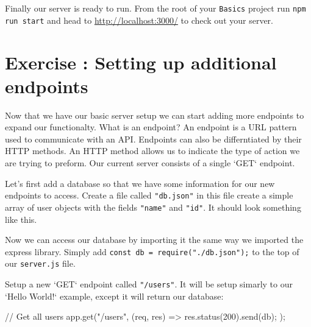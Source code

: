 \documentclass{42-en}
\begin{document}
	Finally our server is ready to run. From the root of your \texttt{Basics} project run \texttt{npm run start} and head to \href{http://localhost:3000/}{http://localhost:3000/} to check out your server.


\newpage
\nextexercice


\chapter{Exercise \exercicenumber: Setting up additional endpoints}

    Now that we have our basic server setup we can start adding more endpoints to expand our functionalty. What is an endpoint? An endpoint is a URL pattern used to communicate with an API. Endpoints can also be differntiated by their HTTP methods. An HTTP method allows us to indicate the type of action we are trying to preform. Our current server consists of a single `GET` endpoint.


    Let's first add a database so that we have some information for our new endpoints to access. Create a file called \texttt{"db.json"} in this file create a simple array of user objects with the fields \texttt{"name"} and \texttt{"id"}. It should look something like this.
\begin{42jscode}
\end{42jscode}

    Now we can access our database by importing it the same way we imported the express library. Simply add \texttt{const db = require("./db.json");} to the top of our \texttt{server.js} file.

    Setup a new `GET` endpoint called \texttt{"/users"}. It will be setup simarly to our `Hello World!` example, except it will return our database:
\begin{42jscode}
// Get all users
app.get("/users", (req, res) => {
    res.status(200).send(db);
});
\end{42jscode}
\end{document}
